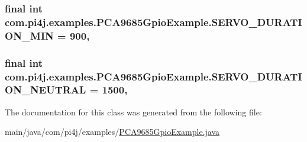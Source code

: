 \subsubsection[{S\+E\+R\+V\+O\+\_\+\+D\+U\+R\+A\+T\+I\+O\+N\+\_\+\+M\+I\+N}]{\setlength{\rightskip}{0pt plus 5cm}final int com.\+pi4j.\+examples.\+P\+C\+A9685\+Gpio\+Example.\+S\+E\+R\+V\+O\+\_\+\+D\+U\+R\+A\+T\+I\+O\+N\+\_\+\+M\+I\+N = 900\hspace{0.3cm}{\ttfamily [static]}, {\ttfamily [private]}}\label{classcom_1_1pi4j_1_1examples_1_1PCA9685GpioExample_a3bd354e9bc3231f26be78a5c70aafd39}
\hypertarget{classcom_1_1pi4j_1_1examples_1_1PCA9685GpioExample_ad1209411ca9274f90edc19471b8a21bf}{}
\subsubsection[{S\+E\+R\+V\+O\+\_\+\+D\+U\+R\+A\+T\+I\+O\+N\+\_\+\+N\+E\+U\+T\+R\+A\+L}]{\setlength{\rightskip}{0pt plus 5cm}final int com.\+pi4j.\+examples.\+P\+C\+A9685\+Gpio\+Example.\+S\+E\+R\+V\+O\+\_\+\+D\+U\+R\+A\+T\+I\+O\+N\+\_\+\+N\+E\+U\+T\+R\+A\+L = 1500\hspace{0.3cm}{\ttfamily [static]}, {\ttfamily [private]}}\label{classcom_1_1pi4j_1_1examples_1_1PCA9685GpioExample_ad1209411ca9274f90edc19471b8a21bf}


The documentation for this class was generated from the following file\+:\begin{DoxyCompactItemize}
\item 
main/java/com/pi4j/examples/\hyperlink{PCA9685GpioExample_8java}{P\+C\+A9685\+Gpio\+Example.\+java}\end{DoxyCompactItemize}
